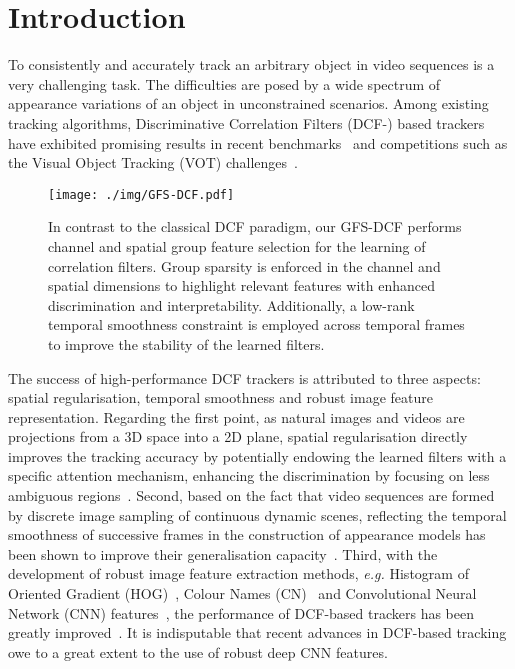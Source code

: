 \documentclass[10pt,twocolumn,letterpaper]{article}
\begin{document}
\section{Introduction}
To consistently and accurately track an arbitrary object in video sequences is a very challenging task.
The difficulties are posed by a wide spectrum of appearance variations of an object in unconstrained scenarios.
Among existing tracking algorithms, Discriminative Correlation Filters (DCF-) based trackers~\cite{Henriques2015High} have exhibited promising results in recent benchmarks~\cite{Wu2013Online,Wu2015Object,mueller2016benchmark,Liang2015Encoding} and competitions such as the Visual Object Tracking (VOT) challenges~\cite{Kristan2015The,Kristan2016The,Kristan2017a,Kristan2018a}. 
\begin{figure}[t]
\begin{center}
\texttt{[image: ./img/GFS-DCF.pdf]}
\end{center}
\caption{In contrast to the classical DCF paradigm, our GFS-DCF performs channel and spatial group feature selection for the learning of correlation filters. Group sparsity is enforced in the channel and spatial dimensions to highlight relevant features with enhanced discrimination and interpretability. Additionally, a low-rank temporal smoothness constraint is employed across temporal frames to improve the stability of the learned filters.}
\label{framework}
\end{figure}

The success of high-performance DCF trackers is attributed to three aspects: spatial regularisation, temporal smoothness and robust image feature representation. 
Regarding the first point, as natural images and videos are projections from a 3D space into a 2D plane, spatial regularisation directly improves the tracking accuracy by potentially endowing the learned filters with a specific attention mechanism, enhancing the discrimination by focusing on less ambiguous regions~\cite{Danelljan2015Learning,Lukezic2017Discriminative,Galoogahi2017Learning,zhang2018visual}. 
Second, based on the fact that video sequences are formed by discrete image sampling of continuous dynamic scenes, reflecting the temporal smoothness of successive frames in the construction of appearance models has been shown to improve their generalisation capacity~\cite{danelljan2016adaptive,li2018learning,Danelljan2016ECO,Danelljan2016Beyond}. 
Third, with the development of robust image feature extraction methods, \textit{e.g.} Histogram of Oriented Gradient (HOG)~\cite{dalal2005histograms}, Colour Names (CN)~\cite{Weijer2009Learning} and Convolutional Neural Network (CNN) features~\cite{krizhevsky2012imagenet,szegedy2015going,lu2018deep,dong2018hyperparameter}, the performance of DCF-based trackers has been greatly improved~\cite{bhat2018unveiling,Kristan2018a,Kristan2017a}.
It is indisputable that recent advances in DCF-based tracking owe to a great extent to the use of robust deep CNN features.
\end{document}
